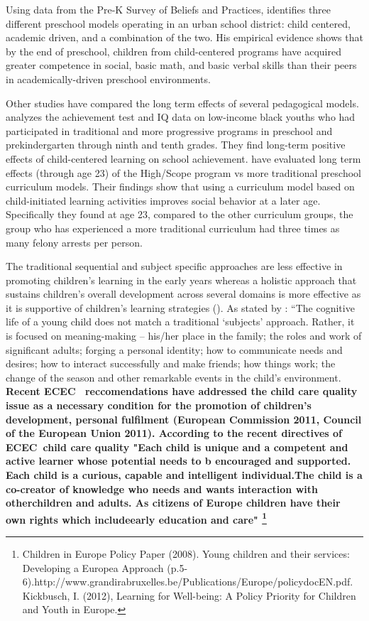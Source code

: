 \documentclass[12pt]{article}
\begin{document}
Using data from the Pre-K Survey of Beliefs and Practices, \cite{Marcon1999}
identifies three different preschool models operating in an urban school
district: child centered, academic driven, and a combination of the two. His
empirical evidence shows that by the end of preschool, children from
child-centered programs have acquired greater competence in social, basic
math, and basic verbal skills than their peers in academically-driven
preschool environments.

Other studies have compared the long term effects of several pedagogical
models. \cite{Miller1984a} analyzes the achievement test and IQ data on
low-income black youths who had participated in traditional and more
progressive programs in preschool and prekindergarten through ninth and
tenth grades. They find long-term positive effects of child-centered
learning on school achievement. \cite{Schweinhart1997} have evaluated long
term effects (through age 23) of the High/Scope program vs more traditional
preschool curriculum models. Their findings show that using a curriculum
model based on child-initiated learning activities improves social behavior
at a later age. Specifically they found at age 23, compared to the other
curriculum groups, the group who has experienced a more traditional
curriculum had three times as many felony arrests per person.

The traditional sequential and subject specific approaches are less
effective in promoting children's learning in the early years whereas a
holistic approach that sustains children's overall development across
several domains is more effective as it is supportive of children's learning
strategies (\cite{Bennett2012}). As stated by \cite{Bennett2013}:
\textquotedblleft The cognitive life of a young child does not match a
traditional `subjects' approach. Rather, it is focused on meaning-making --
his/her place in the family; the roles and work of significant adults;
forging a personal identity; how to communicate needs and desires; how to
interact successfully and make friends; how things work; the change of the
season and other remarkable events in the child's environment. \textbf{%
Recent ECEC \ reccomendations have addressed the child care quality issue as
a necessary condition for the promotion of children's development, personal
fulfilment (European Commission 2011, Council of the European Union 2011).
According to the recent directives of ECEC\ child care quality "Each child
is unique and a competent and active learner whose potential needs to b
encouraged and supported. Each child is a curious, capable and intelligent
individual.The child is a co-creator of knowledge who needs and wants
interaction with otherchildren and adults. As citizens of Europe children
have their own rights which includeearly education and care" \footnote{%
Children in Europe Policy Paper (2008). Young children and their services:
Developing a Europea Approach
(p.5-6).http://www.grandirabruxelles.be/Publications/Europe/policydocEN.pdf. Kickbusch, I. (2012), Learning for Well-being: A Policy Priority for Children and Youth in Europe.%
}}
\end{document}

